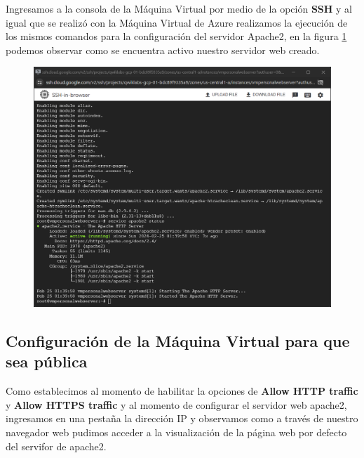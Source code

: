 \documentclass[12pt,a4paper]{article}
\begin{document}
Ingresamos a la consola de la Máquina Virtual por medio de la opción \textbf{SSH} y al igual que se realizó con la Máquina Virtual de Azure realizamos la ejecución de los mismos comandos para la configuración del servidor Apache2, en la figura \ref{fig:Google_3} podemos observar como se encuentra activo nuestro servidor web creado.

\begin{figure}[H]
    \centering
    \includegraphics[width=1\linewidth]{M4_Servicios_Cómputo_en_la_Nube/Tarea_5_Creación_Máquinas_Virtuales_en_Nube/reporte/figuras/2_2_1_PHP_servidor_Web.png}
    \label{fig:Google_3}
\end{figure}

\vspace{5em}

\subsection{Configuración de la Máquina Virtual para que sea pública}

Como establecimos al momento de habilitar la opciones de \textbf{Allow HTTP traffic} y \textbf{Allow HTTPS traffic} y al momento de configurar el servidor web apache2, ingresamos en una pestaña la dirección IP y observamos como a través de nuestro navegador web pudimos acceder a la visualización de la página web por defecto del servifor de apache2.
\end{document}

